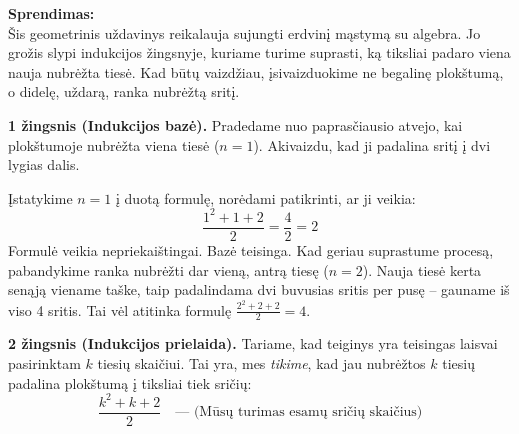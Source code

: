\documentclass[11pt,a4paper]{scrartcl}
\begin{document}
\textbf{Sprendimas:}\\
Šis geometrinis uždavinys reikalauja sujungti erdvinį mąstymą su algebra. Jo grožis slypi indukcijos žingsnyje, kuriame turime suprasti, ką tiksliai padaro viena nauja nubrėžta tiesė. Kad būtų vaizdžiau, įsivaizduokime ne begalinę plokštumą, o didelę, uždarą, ranka nubrėžtą sritį.

\textbf{1 žingsnis (Indukcijos bazė).} Pradedame nuo paprasčiausio atvejo, kai plokštumoje nubrėžta viena tiesė ($n = 1$). Akivaizdu, kad ji padalina sritį į dvi lygias dalis. 
\begin{center}
\end{center}
Įstatykime $n=1$ į duotą formulę, norėdami patikrinti, ar ji veikia:
$$ \frac{1^2 + 1 + 2}{2} = \frac{4}{2} = 2 $$
Formulė veikia nepriekaištingai. Bazė teisinga. Kad geriau suprastume procesą, pabandykime ranka nubrėžti dar vieną, antrą tiesę ($n=2$). Nauja tiesė kerta senąją viename taške, taip padalindama dvi buvusias sritis per pusę – gauname iš viso 4 sritis. Tai vėl atitinka formulę $\frac{2^2+2+2}{2} = 4$.
\begin{center}
\end{center}

\textbf{2 žingsnis (Indukcijos prielaida).} Tariame, kad teiginys yra teisingas laisvai pasirinktam $k$ tiesių skaičiui. Tai yra, mes \textit{tikime}, kad jau nubrėžtos $k$ tiesių padalina plokštumą į tiksliai tiek sričių:
$$ \frac{k^2 + k + 2}{2} \quad \text{--- (Mūsų turimas esamų sričių skaičius)} $$
\end{document}
